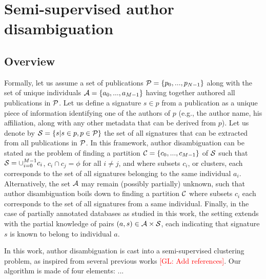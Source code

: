 \documentclass{article}
\newcommand{\glnote}[1]{\textcolor{red}{[GL: #1]}}
\begin{document}

\section{Semi-supervised author disambiguation}
\label{methods}

\subsection{Overview}

Formally, let us assume a set of publications ${\cal P} = \{ p_0, ...,
p_{N-1}\}$ along with the set of unique individuals ${\cal A} = \{ a_0, ...,
a_{M-1}\}$ having together authored all publications in ${\cal P}$.  Let us
define a signature $s \in p$ from a publication as a unique piece of
information identifying one of the authors of $p$ (e.g., the author name, his
affiliation, along with any other metadata that can be derived from $p$). Let us
denote by ${\cal S} = \{ s | s \in p, p \in {\cal P} \}$ the set of all
signatures that can be extracted from all publications in ${\cal P}$. In this
framework, author disambiguation can be stated as the problem of
finding a partition ${\cal C} = \{ c_0, ..., c_{M-1} \}$ of ${\cal S}$ such
that ${\cal S} = \cup_{i=0}^{M-1} c_i$, $c_i \cap c_j = \phi$ for all $i \neq
j$, and where subsets $c_i$, or clusters, each corresponds to the set of all
signatures belonging to the same individual $a_i$. Alternatively, the set
${\cal A}$ may remain (possibly partially) unknown, such that author
disambiguation boils down to finding a partition ${\cal C}$ where
subsets $c_i$  each corresponds to the set of all signatures from a same
individual. Finally, in the case of partially annotated databases as studied in
this work, the setting extends with the partial knowledge of pairs $(a, s) \in
{\cal A} \times {\cal S}$, each indicating that signature $s$ is known to
belong to individual $a$.

In this work, author disambiguation is cast into a semi-supervised clustering
problem, as inspired from several previous works \glnote{Add references}.
Our algorithm is made of four elements: ...
\end{document}
